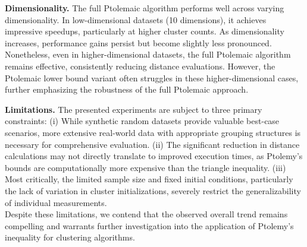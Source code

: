 \textbf{Dimensionality.} The full Ptolemaic algorithm performs well across varying dimensionality. In low-dimensional datasets (10 dimensions), it achieves impressive speedups, particularly at higher cluster counts.
As dimensionality increases, performance gains persist but become slightly less pronounced.
Nonetheless, even in higher-dimensional datasets, the full Ptolemaic algorithm remains effective, consistently reducing distance evaluations.
However, the Ptolemaic lower bound variant often struggles in these higher-dimensional cases, further emphasizing the robustness of the full Ptolemaic approach.



\textbf{Limitations.}
The presented experiments are subject to three primary constraints:
(i) While synthetic random datasets provide valuable best-case scenarios, more extensive real-world data with appropriate grouping structures is necessary for comprehensive evaluation.
(ii) The significant reduction in distance calculations may not directly translate to improved execution times, as Ptolemy's bounds are computationally more expensive than the triangle inequality.
(iii) Most critically, the limited sample size and fixed initial conditions, particularly the lack of variation in cluster initializations, severely restrict the generalizability of individual measurements.\\
Despite these limitations, we contend that the observed overall trend remains compelling and warrants further investigation into the application of Ptolemy's inequality for clustering algorithms.


